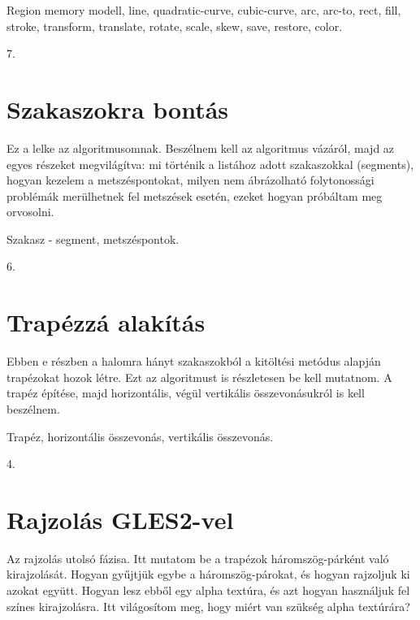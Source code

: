 \documentclass[12pt]{report}
\theoremstyle{definition}
\begin{document}
  \begin{description}[noitemsep]
    \item[Kulcsszavak] Region memory modell, line, quadratic-curve,
    cubic-curve, arc, arc-to, rect, fill, stroke, transform, translate, rotate,
    scale, skew, save, restore, color.
    \item[Becsült oldalszám] 7.
  \end{description}

  \section{Szakaszokra bontás}

Ez a lelke az algoritmusomnak. Beszélnem kell az algoritmus vázáról, majd
az egyes részeket megvilágítva: mi történik a listához adott
szakaszokkal (segments), hogyan kezelem a metszéspontokat, milyen nem
ábrázolható folytonossági problémák merülhetnek fel metszések
esetén, ezeket hogyan próbáltam meg orvosolni.

  \begin{description}[noitemsep]
    \item[Kulcsszavak] Szakasz - segment, metszéspontok.
    \item[Becsült oldalszám] 6.
  \end{description}

  \section{Trapézzá alakítás}

Ebben e részben a halomra hányt szakaszokból a kitöltési metódus
alapján trapézokat hozok létre. Ezt az algoritmust is részletesen be kell
mutatnom. A trapéz építése, majd horizontális, végül vertikális
összevonásukról is kell beszélnem.

  \begin{description}[noitemsep]
    \item[Kulcsszavak] Trapéz, horizontális összevonás, vertikális összevonás.
    \item[Becsült oldalszám] 4.
  \end{description}

  \section{Rajzolás GLES2-vel}

Az rajzolás utolsó fázisa. Itt mutatom be a trapézok
háromszög-párként való kirajzolását. Hogyan gyűjtjük egybe a
háromszög-párokat, és hogyan rajzoljuk ki azokat együtt. Hogyan lesz
ebből egy alpha textúra, és azt hogyan használjuk fel színes
kirajzolásra. Itt világosítom meg, hogy miért van szükség alpha textúrára?
\end{document}
